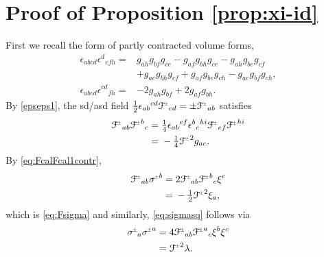 \documentclass[a4paper,11pt,reqno]{amsart}
\theoremstyle{plain}
\newcommand{\PM}[1]{{{#1}^{\hspace{-.5pt}\scaleto{\pm}{3.5pt}}}}
\def\Fcal{\mathcal{F}}
\numberwithin{equation}{section}
\begin{document}
%
\appendix 
%
\section{Proof of Proposition \ref{prop:xi-id}} \label{sec:xi-id-proof} 


%
First we recall the form of partly contracted volume forms,
\begin{align}
\epsilon_{abcd}\epsilon^{d}{}_{efh}
={}&g_{ah} g_{bf} g_{ce}
 -  g_{af} g_{bh} g_{ce}  -  g_{ah} g_{be} g_{cf}\nonumber \\
 & + g_{ae} g_{bh} g_{cf}
 + g_{af} g_{be} g_{ch}
 -  g_{ae} g_{bf} g_{ch}, \label{epseps1}\\
\epsilon_{abcd}\epsilon^{cd}{}_{fh}={}&-2 g_{ah} g_{bf}
 + 2 g_{af} g_{bh}.\label{epseps2}
\end{align}
By \eqref{epseps1}, the sd/asd field $\tfrac{1}{2} \epsilon_{ab}{}^{cd}  \PM{\Fcal}_{cd} = \pm \PM{\Fcal}_{ab} $ satisfies
\begin{align} \label{eq:FcalFcal1contr}
\PM{\Fcal}_{ab} \PM{\Fcal}^{b}{}_{c} 
={}& \tfrac{1}{4} \epsilon_{ab}{}^{ef}\epsilon^{b}{}_{c}{}^{hi} \PM{\Fcal}_{ef} \PM{\Fcal}^{hi} \nonumber \\
={}& -\tfrac{1}{4}  \PM{\Fcal}^2 g_{ac}.
\end{align}
By \eqref{eq:FcalFcal1contr},
\begin{align*}
\PM{\Fcal}_{ab} \PM{\sigma}^{b}
={}& 2 \PM{\Fcal}_{ab} \PM{\Fcal}^{b}{}_{c} \xi^{c} \\
={}& - \tfrac{1}{2} \PM{\Fcal}^2\xi_{a}, 
\end{align*}
which is \eqref{eq:Fsigma} and similarly, \eqref{eq:sigmasq} follows via
\begin{align*}
\PM{\sigma}_{a} \PM{\sigma}^{a}
={}& 4 \PM{\Fcal}_{ab} \PM{\Fcal}^{a}{}_{c} \xi^{b} \xi^{c}\\
={}& \PM{\Fcal}^2 \lambda.
\end{align*}
\end{document}
